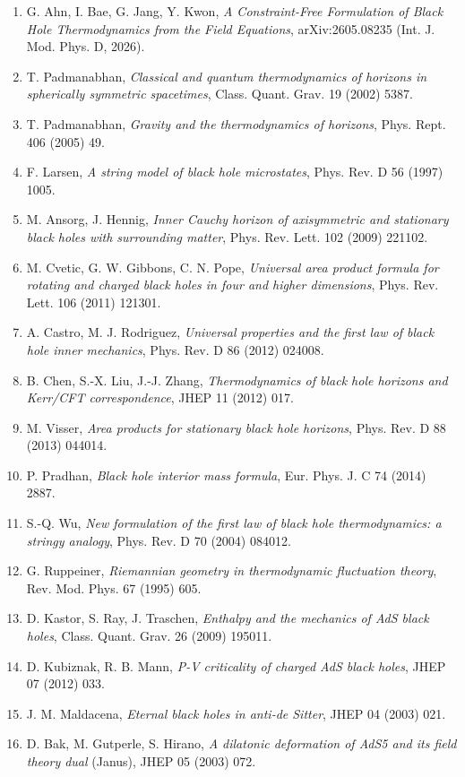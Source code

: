 \documentclass[11pt]{article}
\begin{document}
\begin{enumerate}
\item G. Ahn, I. Bae, G. Jang, Y. Kwon, \emph{A Constraint-Free Formulation of Black Hole Thermodynamics from the Field Equations}, arXiv:2605.08235 (Int. J. Mod. Phys. D, 2026).
\item T. Padmanabhan, \emph{Classical and quantum thermodynamics of horizons in spherically symmetric spacetimes}, Class. Quant. Grav. 19 (2002) 5387.
\item T. Padmanabhan, \emph{Gravity and the thermodynamics of horizons}, Phys. Rept. 406 (2005) 49.
\item F. Larsen, \emph{A string model of black hole microstates}, Phys. Rev. D 56 (1997) 1005.
\item M. Ansorg, J. Hennig, \emph{Inner Cauchy horizon of axisymmetric and stationary black holes with surrounding matter}, Phys. Rev. Lett. 102 (2009) 221102.
\item M. Cvetic, G. W. Gibbons, C. N. Pope, \emph{Universal area product formula for rotating and charged black holes in four and higher dimensions}, Phys. Rev. Lett. 106 (2011) 121301.
\item A. Castro, M. J. Rodriguez, \emph{Universal properties and the first law of black hole inner mechanics}, Phys. Rev. D 86 (2012) 024008.
\item B. Chen, S.-X. Liu, J.-J. Zhang, \emph{Thermodynamics of black hole horizons and Kerr/CFT correspondence}, JHEP 11 (2012) 017.
\item M. Visser, \emph{Area products for stationary black hole horizons}, Phys. Rev. D 88 (2013) 044014.
\item P. Pradhan, \emph{Black hole interior mass formula}, Eur. Phys. J. C 74 (2014) 2887.
\item S.-Q. Wu, \emph{New formulation of the first law of black hole thermodynamics: a stringy analogy}, Phys. Rev. D 70 (2004) 084012.
\item G. Ruppeiner, \emph{Riemannian geometry in thermodynamic fluctuation theory}, Rev. Mod. Phys. 67 (1995) 605.
\item D. Kastor, S. Ray, J. Traschen, \emph{Enthalpy and the mechanics of AdS black holes}, Class. Quant. Grav. 26 (2009) 195011.
\item D. Kubiznak, R. B. Mann, \emph{P-V criticality of charged AdS black holes}, JHEP 07 (2012) 033.
\item J. M. Maldacena, \emph{Eternal black holes in anti-de Sitter}, JHEP 04 (2003) 021.
\item D. Bak, M. Gutperle, S. Hirano, \emph{A dilatonic deformation of AdS5 and its field theory dual} (Janus), JHEP 05 (2003) 072.

\end{enumerate}
\end{document}
